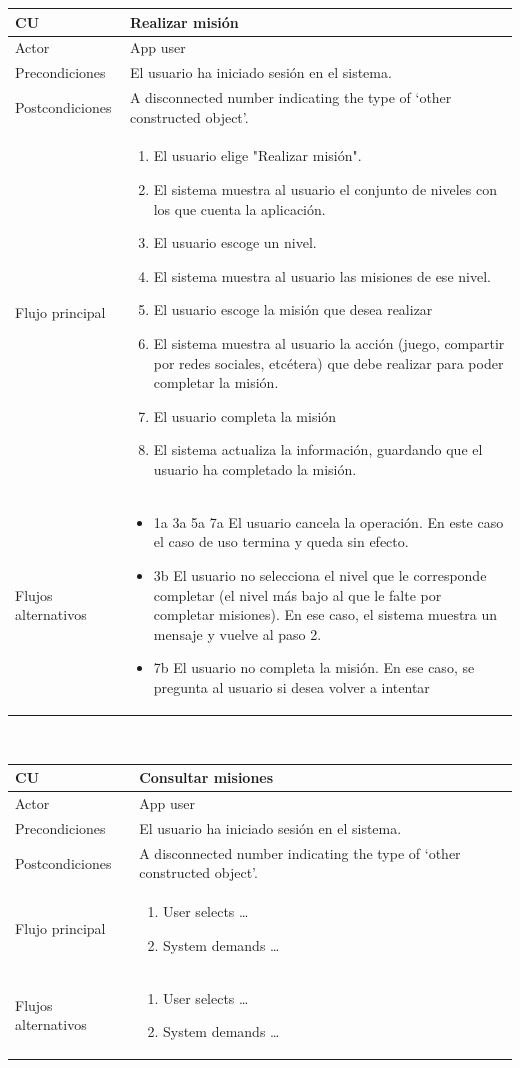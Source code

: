 \documentclass[twoside]{report}
\newcommand\addrow[2]{#1 &#2\\ }
\newcommand\addheading[2]{#1 &#2\\ \hline}
\newcommand\tabularhead{\begin{tabular}{lp{0.7\textwidth}}
\hline
}
\newcommand\addmulrow[2]{ \begin{minipage}[t][][t]{2.5cm}#1\end{minipage}%
   &\begin{minipage}[t][][t]{8cm}
    \begin{enumerate} #2   \end{enumerate}
    \end{minipage}\\ }
\newenvironment{usecase}{\tabularhead}
{\hline\end{tabular}}
\begin{document}
\begin{usecase}
  \addheading{\textbf{CU\arabic{usecase}}}{Realizar misión} 
  \addrow{Actor}{App user}
  \addrow{Precondiciones}{El usuario ha iniciado sesión en el sistema.}
  \addrow{Postcondiciones}{A disconnected number indicating the type of `other constructed object'.}
  \addmulrow{Flujo principal}{
  		\item El usuario elige "Realizar misión". %
  		\item El sistema muestra al usuario el conjunto de niveles con los que cuenta la aplicación. %
  		\item El usuario escoge un nivel. %
  		\item El sistema muestra al usuario las misiones de ese nivel. %
  		\item El usuario escoge la misión que desea realizar %
  		\item El sistema muestra al usuario la acción (juego, compartir por redes sociales, etcétera) que debe realizar para poder completar la misión. %
  		\item El usuario completa la misión %
  		\item El sistema actualiza la información, guardando que el usuario ha completado la misión. %
  }
  \addrow{Flujos alternativos}{
  		\begin{itemize}
  		\item 1a 3a 5a 7a El usuario cancela la operación. En este caso el caso de uso termina y queda sin efecto.
        \item 3b El usuario no selecciona el nivel que le corresponde completar (el nivel más bajo al que le falte por completar misiones). En ese caso, el sistema muestra un mensaje y vuelve al paso 2.
        \item 7b El usuario no completa la misión. En ese caso, se pregunta al usuario si desea volver a intentar
  		\end{itemize}
  }
\end{usecase}\\

\begin{usecase}
  \addheading{\textbf{CU\arabic{usecase}}}{Consultar misiones} 
  \addrow{Actor}{App user}
  \addrow{Precondiciones}{El usuario ha iniciado sesión en el sistema.}
  \addrow{Postcondiciones}{A disconnected number indicating the type of `other constructed object'.}
  \addmulrow{Flujo principal}{
  		\item User selects \ldots
        \item System demands \ldots
  }
  \addmulrow{Flujos alternativos}{
  		\item User selects \ldots
        \item System demands \ldots
  }
\end{usecase}\\
\end{document}
